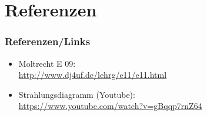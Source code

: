 


\section*{Referenzen}

\begin{frame}
    \frametitle{Referenzen/Links}
    
    \footnotesize
    \begin{itemize}
        \item Moltrecht E 09: \\
              \url{http://www.dj4uf.de/lehrg/e11/e11.html}
        \item Strahlungsdiagramm (Youtube): \\
              \url{https://www.youtube.com/watch?v=gBqqp7rnZ64}
    \end{itemize}

\end{frame}




